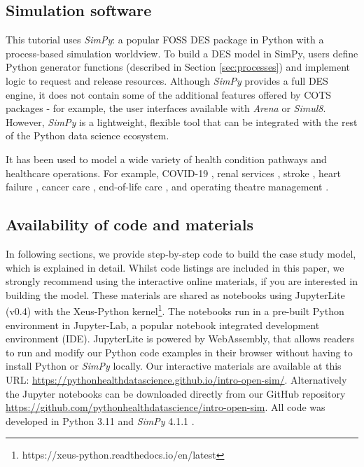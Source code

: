 \documentclass{swpaperproc}
\theoremstyle{sw}
\begin{document}

\subsection{Simulation software}

This tutorial uses \textit{SimPy}: a popular FOSS DES package in Python with a process-based simulation worldview. To build a DES model in SimPy, users define Python generator functions (described in Section \ref{sec:processes}) and implement logic to request and release resources. Although \textit{SimPy} provides a full DES engine, it does not contain some of the additional features offered by COTS packages - for example, the user interfaces available with \textit{Arena} or \textit{Simul8}. However, \textit{SimPy} is a lightweight, flexible tool that can be integrated with the rest of the Python data science ecosystem.

It has been used to model a wide variety of health condition pathways and healthcare operations. For example, COVID-19 , renal services , stroke , heart failure , cancer care , end-of-life care , and operating theatre management .

\subsection{Availability of code and materials}

In following sections, we provide step-by-step code to build the case study model, which is explained in detail. Whilst code listings are included in this paper, we strongly recommend using the interactive online materials, if you are interested in building the model. These materials are shared as notebooks using JupyterLite (v0.4) with the Xeus-Python kernel\footnote{https://xeus-python.readthedocs.io/en/latest}. The notebooks run in a pre-built Python environment in Jupyter-Lab, a popular notebook integrated development environment (IDE). JupyterLite is powered by WebAssembly, that allows readers to run and modify our Python code examples in their browser without having to install Python or \textit{SimPy} locally. Our interactive materials are available at this URL: \url{https://pythonhealthdatascience.github.io/intro-open-sim/}.  Alternatively the Jupyter notebooks can be downloaded directly from our GitHub repository \url{https://github.com/pythonhealthdatascience/intro-open-sim}. All code was developed in Python 3.11 and \textit{SimPy} 4.1.1 \cite{simpy}. 
\end{document}
